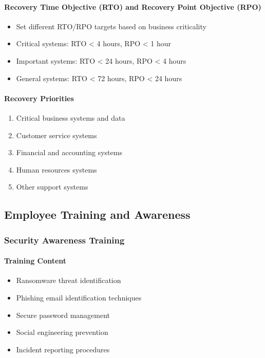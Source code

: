 \documentclass[12pt,a4paper]{article}
\begin{document}
\paragraph{Recovery Time Objective (RTO) and Recovery Point Objective (RPO)}
\begin{itemize}
    \item Set different RTO/RPO targets based on business criticality
    \item Critical systems: RTO < 4 hours, RPO < 1 hour
    \item Important systems: RTO < 24 hours, RPO < 4 hours
    \item General systems: RTO < 72 hours, RPO < 24 hours
\end{itemize}

\paragraph{Recovery Priorities}
\begin{enumerate}
    \item Critical business systems and data
    \item Customer service systems
    \item Financial and accounting systems
    \item Human resources systems
    \item Other support systems
\end{enumerate}

\subsection{Employee Training and Awareness}

\subsubsection{Security Awareness Training}

\paragraph{Training Content}
\begin{itemize}
    \item Ransomware threat identification
    \item Phishing email identification techniques
    \item Secure password management
    \item Social engineering prevention
    \item Incident reporting procedures
\end{itemize}
\end{document}
